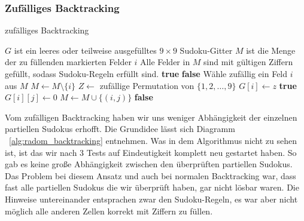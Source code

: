 \subsubsection{Zufälliges Backtracking}
\begin{algorithm}
    \caption{zufälliges Backtracking}
    \label{alg:radom_backtracking}
    \begin{algorithmic}[1]
        \Require $G$ ist ein leeres oder teilweise ausgefülltes $9 \times 9$ Sudoku-Gitter
        \Require $M$ ist die Menge der zu füllenden markierten Felder $i$
        \Ensure Alle Felder in $M$ sind mit gültigen Ziffern gefüllt, sodass Sudoku-Regeln erfüllt sind.
                    \State \Return \textbf{true} 
                \Else
                    \State \Return \textbf{false} 
                \EndIf
            \EndIf
            \State Wähle zufällig ein Feld $i$ aus $M$
            \State $M \gets M \setminus \{i\}$
            \State $Z \gets$ zufällige Permutation von $\{1,2,\dots,9\}$
                    \State $G[i] \gets z$
                        \State \Return \textbf{true}
                    \EndIf
                    \State $G[i][j] \gets 0$ 
                \EndIf
            \EndFor
            \State $M \gets M \cup \{(i,j)\}$ 
            \State \Return \textbf{false}
        \EndFunction
    \end{algorithmic}
\end{algorithm}

Vom zufälligen Backtracking haben wir uns weniger Abhängigkeit der einzelnen partiellen Sudokus erhofft.
Die Grundidee lässt sich Diagramm ~\ref{alg:radom_backtracking} entnehmen.
Was in dem Algorithmus nicht zu sehen ist, ist das wir nach 3 Tests auf Eindeutigkeit komplett neu gestartet haben.
So gab es keine große Abhängigkeit zwischen den überprüften partiellen Sudokus.
Das Problem bei diesem Ansatz und auch bei normalen Backtracking war,
dass fast alle partiellen Sudokus die wir überprüft haben, gar nicht lösbar waren.
Die Hinweise untereinander entsprachen zwar den Sudoku-Regeln, es war aber nicht möglich alle anderen Zellen korrekt mit Ziffern zu füllen.

